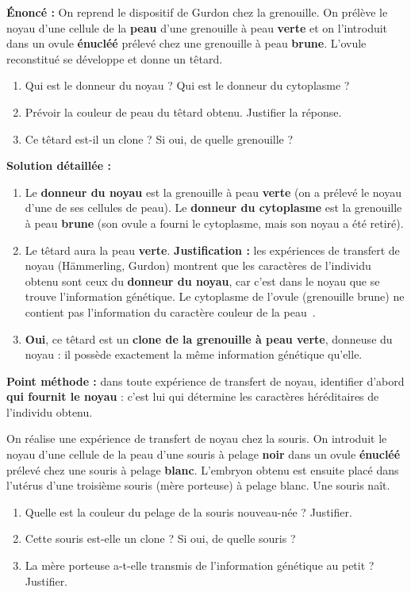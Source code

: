 \documentclass[11pt]{article}
\begin{document}
\begin{exoresolu}
\textbf{Énoncé :} On reprend le dispositif de Gurdon chez la grenouille. On prélève le noyau d'une cellule de la \textbf{peau} d'une grenouille à peau \textbf{verte} et on l'introduit dans un ovule \textbf{énucléé} prélevé chez une grenouille à peau \textbf{brune}. L'ovule reconstitué se développe et donne un têtard.
\begin{enumerate}
    \item Qui est le donneur du noyau ? Qui est le donneur du cytoplasme ?
    \item Prévoir la couleur de peau du têtard obtenu. Justifier la réponse.
    \item Ce têtard est-il un clone ? Si oui, de quelle grenouille ?
\end{enumerate}
\tcblower
\textbf{Solution détaillée :}
\begin{enumerate}
    \item Le \textbf{donneur du noyau} est la grenouille à peau \textbf{verte} (on a prélevé le noyau d'une de ses cellules de peau). Le \textbf{donneur du cytoplasme} est la grenouille à peau \textbf{brune} (son ovule a fourni le cytoplasme, mais son noyau a été retiré).
    \item Le têtard aura la peau \textbf{verte}. \textbf{Justification :} les expériences de transfert de noyau (Hämmerling, Gurdon) montrent que les caractères de l'individu obtenu sont ceux du \textbf{donneur du noyau}, car c'est dans le noyau que se trouve l'information génétique. Le cytoplasme de l'ovule (grenouille brune) ne contient pas l'information du caractère \og couleur de la peau~\fg{}.
    \item \textbf{Oui}, ce têtard est un \textbf{clone de la grenouille à peau verte}, donneuse du noyau : il possède exactement la même information génétique qu'elle.
\end{enumerate}
\textbf{Point méthode :} dans toute expérience de transfert de noyau, identifier d'abord \textbf{qui fournit le noyau} : c'est lui qui détermine les caractères héréditaires de l'individu obtenu.
\end{exoresolu}

\begin{exercice}
On réalise une expérience de transfert de noyau chez la souris. On introduit le noyau d'une cellule de la peau d'une souris à pelage \textbf{noir} dans un ovule \textbf{énucléé} prélevé chez une souris à pelage \textbf{blanc}. L'embryon obtenu est ensuite placé dans l'utérus d'une troisième souris (mère porteuse) à pelage blanc. Une souris naît.
\begin{enumerate}
    \item Quelle est la couleur du pelage de la souris nouveau-née ? Justifier.
    \item Cette souris est-elle un clone ? Si oui, de quelle souris ?
    \item La mère porteuse a-t-elle transmis de l'information génétique au petit ? Justifier.
\end{enumerate}
\end{exercice}
\end{document}
